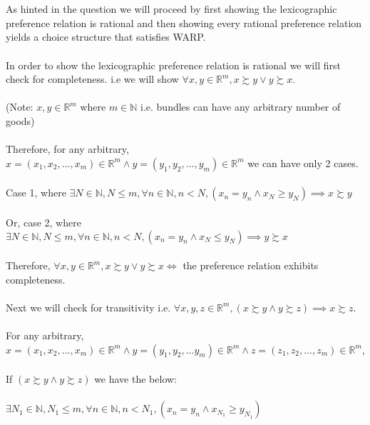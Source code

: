 \documentclass[12pt]{article}
\newenvironment{problem}[2][Problem]{\begin{trivlist}
\item[\hskip \labelsep {\bfseries #1}\hskip \labelsep {\bfseries #2.}]}{\end{trivlist}}
\begin{document}
\begin{problem}{4}.
\\
\\
As hinted in the question we will proceed by first showing the lexicographic preference relation is rational and then showing every rational preference relation yields a choice structure that satisfies WARP. 
\\
\\
In order to show the lexicographic preference relation is rational we will first check for completeness. i.e we will show $\forall x, y \in \mathbb{R}^{m}, x \succsim y \lor y \succsim x. $  
\\
\\
(Note: $ x, y \in  \mathbb{R}^{m}$ where $ m \in \mathbb{N} $ i.e. bundles can have any arbitrary number of goods)  
\\
\\
Therefore, for any arbitrary, $x = (x_1, x_2,..., x_m) \in \mathbb{R}^{m} \land  y= (y_1, y_2, ..., y_m) \in \mathbb{R}^{m}$ we can have only 2 cases. 
\\
\\Case 1, where $ \exists N \in  \mathbb{N}, N \leq m, \forall n \in \mathbb{N}, n < N, (x_n = y_n \land x_N \geq y_N) \implies x \succsim y $  
\\
\\
Or, case 2, where $ \exists N \in  \mathbb{N}, N \leq m, \forall n \in \mathbb{N}, n < N, (x_n = y_n \land x_N \leq y_N) \implies y \succsim x $ 
\\
\\
Therefore, $\forall x, y \in \mathbb{R}^{m}, x \succsim y \lor y \succsim x \iff $ the preference relation exhibits completeness.
\\
\\
Next we will check for transitivity i.e. $\forall x, y, z \in \mathbb{R}^{m}, (x \succsim y \land y \succsim z) \implies x \succsim z.$
\\
\\
For any arbitrary, $x = (x_1, x_2, ..., x_m) \in \mathbb{R}^{m} \land  y= (y_1, y_2, ... y_m) \in \mathbb{R}^{m} \land z = (z_1, z_2, ...,z_m) \in \mathbb{R}^{m}$, 
\\
\\
If $ (x \succsim y \land y \succsim z) $ we have the below:
\\
\\
$ \exists N_1 \in  \mathbb{N}, N_1 \leq m, \forall n \in \mathbb{N}, n < N_1, (x_n = y_n \land x_{N_1} \geq y_{N_1})  $  
\\

\end{problem}
\end{document}
